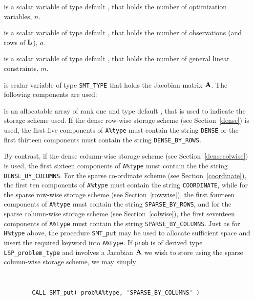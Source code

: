 \documentclass{galahad}
\newcommand{\packagename}{LSP}
\begin{document}
\begin{description}

 is a scalar variable of type default \integer, 
 that holds the number of optimization variables, $n$.  
              
 is a scalar variable of type default \integer, 
 that holds the number of observations (and rows of ${\mathbf{L}}$), $o$.
              
 is a scalar variable of type default \integer, 
 that holds the number of general linear constraints, $m$.
              
 is scalar variable of type {\tt SMT\_TYPE} 
that holds the Jacobian matrix ${\mathbf{A}}$. The following components are used:

\begin{description}

 is an allocatable array of rank one and type default \character, 
that is used to indicate the storage scheme used. If the dense row-wise 
storage scheme (see Section~\ref{dense}) is used, 
the first five components of {\tt A\%type} must contain the
string {\tt DENSE} or the first thirteen components must contain the
string {\tt DENSE\_BY\_ROWS}.

By contrast, if the dense column-wise storage scheme 
(see Section~\ref{densecolwise}) is used, 
the first sixteen components of {\tt A\%type} must contain the
the string {\tt DENSE\_BY\_COLUMNS}.
For the sparse co-ordinate scheme (see Section~\ref{coordinate}), 
the first ten components of {\tt A\%type} must contain the
string {\tt COORDINATE}, while 
for the sparse row-wise storage scheme (see Section~\ref{rowwise}),
the first fourteen components of {\tt A\%type} must contain the
string {\tt SPARSE\_BY\_ROWS},
and for the sparse column-wise storage scheme (see Section~\ref{colwise}),
the first seventeen components of {\tt A\%type} must contain the
string {\tt SPARSE\_BY\_COLUMNS}.
Just as for {\tt H\%type} above, the procedure {\tt SMT\_put} 
may be used to allocate sufficient space and insert the required keyword
into {\tt A\%type}.
If {\tt prob} is of derived type {\tt \packagename\_problem\_type}
and involves a Jacobian ${\mathbf{A}}$ we wish to store using the sparse column-wise 
storage scheme, we may simply
{\tt 
\begin{verbatim}
        CALL SMT_put( prob%A%type, 'SPARSE_BY_COLUMNS' )
\end{verbatim}
}
\noindent


\end{description}
\end{description}
\end{document}
